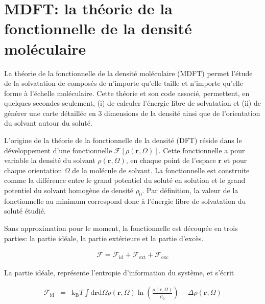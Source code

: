 \chapter{MDFT: la théorie de la fonctionnelle de la densité moléculaire}
\label{chap:theorie}



La théorie de la fonctionnelle de la densité moléculaire (MDFT) permet l'étude de la solvatation de composés de n'importe qu'elle taille et n'importe qu'elle forme à l'échelle moléculaire. Cette théorie et son code associé, permettent, en quelques secondes seulement, (i) de calculer l'énergie libre de solvatation et (ii) de générer une carte détaillée en 3 dimensions de la densité ainsi que de l'orientation du solvant autour du soluté.


L'origine de la théorie de la fonctionnelle de la densité (DFT) réside dans le développement d'une fonctionnelle $\mathcal{F}[\rho\left(\boldsymbol{r},\Omega \right)]$. Cette fonctionnelle a pour variable la densité du solvant $\rho\left(\boldsymbol{r},\Omega \right)$, en chaque point de l'espace $\boldsymbol{r}$ et pour chaque orientation $\Omega$ de la molécule de solvant. La fonctionnelle est construite comme la différence entre le grand potentiel du soluté en solution et le grand potentiel du solvant homogène de densité $\rho_{0}$. Par définition, la valeur de la fonctionnelle au minimum correspond donc à l'énergie libre de solvatation du soluté étudié. 

Sans approximation pour le moment, la fonctionnelle est découpée en trois parties: la partie idéale, la partie extérieure et la partie d'excès\cite{evans_density_2009,henderson_fundamentals_1992}. 


\begin{eqnarray}
\mathcal{F} = \mathcal{F}_\mathrm{id} + \mathcal{F}_\mathrm{ext} + \mathcal{F}_\mathrm{exc}
\label{eq:fonctionnelle}
\end{eqnarray}

La partie idéale, représente l’entropie d'information du système, et s'écrit

\begin{eqnarray}
\mathcal{F}_\mathrm{id}&=&\mathrm{k_B}T\int\mathrm{d}\boldsymbol{r}\mathrm{d}\Omega \rho\left(\boldsymbol{r},\Omega \right)\ln\left(\frac{\rho\left(\boldsymbol{r},\Omega \right)}{\rho_0}\right)-\Delta\rho\left(\boldsymbol{r},\Omega \right)
\label{eq:fonctionnelle:id}
\end{eqnarray}

